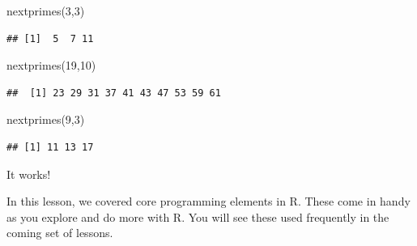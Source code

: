 \documentclass[
]{article}
\newenvironment{Shaded}{\begin{snugshade}}{\end{snugshade}}
\newcommand{\DecValTok}[1]{\textcolor[rgb]{0.00,0.00,0.81}{#1}}
\newcommand{\FunctionTok}[1]{\textcolor[rgb]{0.00,0.00,0.00}{#1}}
\newcommand{\NormalTok}[1]{#1}
\begin{document}
\begin{Shaded}
\begin{Highlighting}[]
\FunctionTok{nextprimes}\NormalTok{(}\DecValTok{3}\NormalTok{,}\DecValTok{3}\NormalTok{)}
\end{Highlighting}
\end{Shaded}

\begin{verbatim}
## [1]  5  7 11
\end{verbatim}

\begin{Shaded}
\begin{Highlighting}[]
\FunctionTok{nextprimes}\NormalTok{(}\DecValTok{19}\NormalTok{,}\DecValTok{10}\NormalTok{)}
\end{Highlighting}
\end{Shaded}

\begin{verbatim}
##  [1] 23 29 31 37 41 43 47 53 59 61
\end{verbatim}

\begin{Shaded}
\begin{Highlighting}[]
\FunctionTok{nextprimes}\NormalTok{(}\DecValTok{9}\NormalTok{,}\DecValTok{3}\NormalTok{)}
\end{Highlighting}
\end{Shaded}

\begin{verbatim}
## [1] 11 13 17
\end{verbatim}

It works!

In this lesson, we covered core programming elements in R. These come in
handy as you explore and do more with R. You will see these used
frequently in the coming set of lessons.
\end{document}
